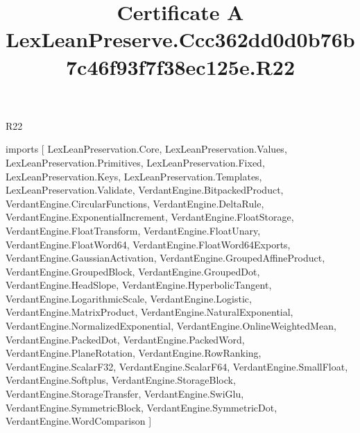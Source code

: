 \begin{lexlean}{R22}
\title{Certificate A LexLeanPreserve.Ccc362dd0d0b76b7c46f93f7f38ec125e.R22}
\begin{coremodule}
imports [
  LexLeanPreservation.Core,
  LexLeanPreservation.Values,
  LexLeanPreservation.Primitives,
  LexLeanPreservation.Fixed,
  LexLeanPreservation.Keys,
  LexLeanPreservation.Templates,
  LexLeanPreservation.Validate,
  VerdantEngine.BitpackedProduct,
  VerdantEngine.CircularFunctions,
  VerdantEngine.DeltaRule,
  VerdantEngine.ExponentialIncrement,
  VerdantEngine.FloatStorage,
  VerdantEngine.FloatTransform,
  VerdantEngine.FloatUnary,
  VerdantEngine.FloatWord64,
  VerdantEngine.FloatWord64Exports,
  VerdantEngine.GaussianActivation,
  VerdantEngine.GroupedAffineProduct,
  VerdantEngine.GroupedBlock,
  VerdantEngine.GroupedDot,
  VerdantEngine.HeadSlope,
  VerdantEngine.HyperbolicTangent,
  VerdantEngine.LogarithmicScale,
  VerdantEngine.Logistic,
  VerdantEngine.MatrixProduct,
  VerdantEngine.NaturalExponential,
  VerdantEngine.NormalizedExponential,
  VerdantEngine.OnlineWeightedMean,
  VerdantEngine.PackedDot,
  VerdantEngine.PackedWord,
  VerdantEngine.PlaneRotation,
  VerdantEngine.RowRanking,
  VerdantEngine.ScalarF32,
  VerdantEngine.ScalarF64,
  VerdantEngine.SmallFloat,
  VerdantEngine.Softplus,
  VerdantEngine.StorageBlock,
  VerdantEngine.StorageTransfer,
  VerdantEngine.SwiGlu,
  VerdantEngine.SymmetricBlock,
  VerdantEngine.SymmetricDot,
  VerdantEngine.WordComparison
]


\end{coremodule}
\end{lexlean}

